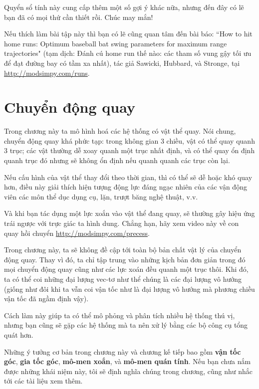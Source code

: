 \documentclass[12pt, openany]{book}
\theoremstyle{exercise}
\begin{document}
Quyển sổ tính này cung cấp thêm một số gợi ý khác nữa, nhưng đến đây có lẽ bạn đã có mọi thứ cần thiết rồi.  Chúc may mắn!

Nếu thích làm bài tập này thì bạn có lẽ cũng quan tâm đến bài báo: ``How to hit home runs: Optimum baseball bat swing parameters for maximum range trajectories" (tạm dịch: Đánh cú home run thế nào: các tham số vung gậy tối ưu để đạt đường bay có tầm xa nhất), tác giả Sawicki, Hubbard, và Stronge, tại \url{http://modsimpy.com/runs}.


\chapter{Chuyển động quay}
\label{chap24}

Trong chương này ta mô hình hoá các hệ thống có vật thể quay. Nói chung, chuyển động quay khá phức tạp: trong không gian 3 chiều, vật có thể quay quanh 3 trục; các vật thường dễ xoay quanh một trục nhất định, và có thể quay ổn định quanh trục đó nhưng sẽ không ổn định nếu quanh quanh các trục còn lại.


Nếu cấu hình của vật thể thay đổi theo thời gian, thì có thể sẽ dễ hoặc khó quay hơn, điều này giải thích hiện tượng động lực đáng ngạc nhiên của các vận động viên các môn thể dục dụng cụ, lặn, trượt băng nghệ thuật, v.v.

Và khi bạn tác dụng một lực xoắn vào vật thể đang quay, sẽ thường gây hiệu ứng trái ngược với trực giác ta hình dung. Chẳng hạn, hãy xem video này về con quay hồi chuyển \url{http://modsimpy.com/precess}.


Trong chương này, ta sẽ không đề cập tới toàn bộ bản chất vật lý của chuyển động quay. Thay vì đó, ta chỉ tập trung vào những kịch bản đơn giản trong đó mọi chuyển động quay cũng như các lực xoán đều quanh một trục thôi. Khi đó, ta có thể coi những đại lượng vec-tơ như thể chúng là các đại lượng vô hướng (giống như đôi khi ta vẫn coi vận tốc như là đại lượng vô hướng mà phương chiều vận tốc đã ngầm định vậy).


Cách làm này giúp ta có thể mô phỏng và phân tích nhiều hệ thống thú vị, nhưng bạn cũng sẽ gặp các hệ thống mà ta nên xử lý bằng các bộ công cụ tổng quát hơn.

Những ý tưởng cơ bản trong chương này và chương kế tiếp bao gồm {\bf vận tốc góc}, {\bf gia tốc góc}, {\bf mô-men xoắn}, và {\bf mô-men quán tính}.  Nếu bạn chưa nắm được những khái niệm này, tôi sẽ định nghĩa chúng trong chương, cũng như nhắc tới các tài liệu xem thêm.
\end{document}
